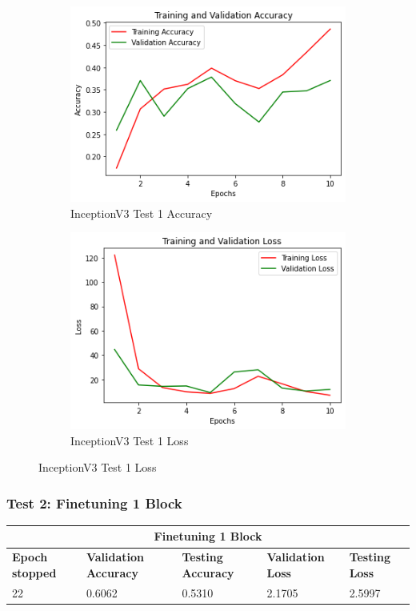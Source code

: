 \begin{figure}[H]
	\begin{subfigure}{0.5\textwidth}
		\includegraphics[width=0.9\linewidth]{img/inception/inceptionfeacc.png} 
		\caption{InceptionV3 Test 1 Accuracy}
		\label{fig:inceptionfeacc}
	\end{subfigure}
	\begin{subfigure}{0.5\textwidth}
		\includegraphics[width=0.9\linewidth]{img/inception/inceptionfeloss.png}
		\caption{InceptionV3 Test 1 Loss}
		\label{fig:inceptionfeloss}
	\end{subfigure}
\end{figure}

\subsubsection{Test 2: Finetuning 1 Block}

\begin{tabular}{ |p{2cm}|p{2cm}|p{2cm}|p{2cm}|p{2cm}|  }
\hline
\multicolumn{5}{|c|}{Finetuning 1 Block} \\
\hline
\textbf{Epoch stopped} & \textbf{Validation Accuracy} & \textbf{Testing Accuracy} & \textbf{Validation Loss} & \textbf{Testing Loss} \\
\hline
22 & 0.6062 & 0.5310 & 2.1705 & 2.5997\\
\hline
\end{tabular}

